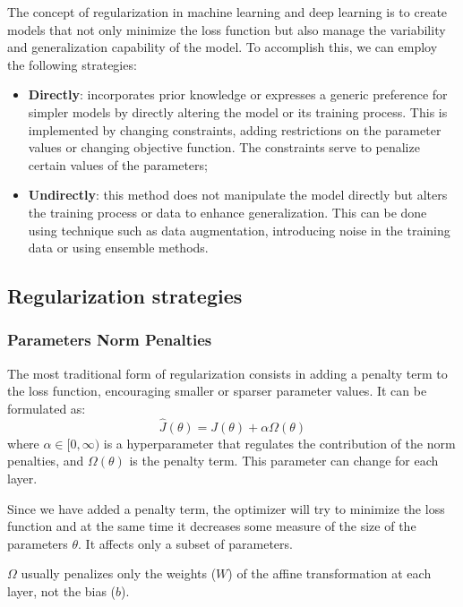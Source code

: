 The concept of regularization in machine learning and deep learning is to create
models that not only minimize the loss function but also manage the variability
and generalization capability of the model. To accomplish this, we can employ the
following strategies:
\begin{itemize}
    \item \textbf{Directly}: incorporates prior knowledge or expresses a generic
          preference for simpler models by directly altering the model or its
          training process. This is implemented by changing constraints, adding
          restrictions on the parameter values or changing objective function.
          The constraints serve to penalize certain values of the parameters;
    \item \textbf{Undirectly}: this method does not manipulate the model directly
          but alters the training process or data to enhance generalization. This
          can be done using technique such as data augmentation, introducing noise
          in the training data or using ensemble methods.
\end{itemize}
\subsection{Regularization strategies}
\subsubsection{Parameters Norm Penalties}
The most traditional form of regularization consists in adding a penalty term to
the loss function, encouraging smaller or sparser parameter values. It can be
formulated as:
\begin{equation}
    \hat{J}(\theta) = J(\theta) + \alpha \Omega(\theta)
\end{equation}
where $\alpha \in [0, \infty)$ is a hyperparameter that regulates the contribution
of the norm penalties, and $\Omega(\theta)$ is the penalty term. This parameter
can change for each layer.

Since we have added a penalty term, the optimizer will try to minimize the loss
function and at the same time it decreases some measure of the size of the
parameters $\theta$. It affects only a subset of parameters.

$\Omega$ usually penalizes only the weights ($W$) of the affine transformation
at each layer, not the bias ($b$).

